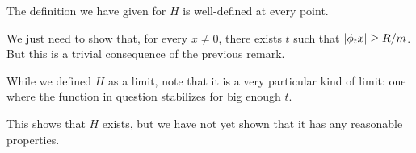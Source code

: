 \documentclass{article}
\DeclarePairedDelimiter{\abs}{\lvert}{\rvert}
\begin{document}
\begin{Proposition}
The definition we have given for $H$ is well-defined at every point.
\end{Proposition}

\begin{Proof}
We just need to show that, for every $x \neq 0$, there exists $t$ such that $\abs{\phi_t x} \geq R/m$. But this is a trivial consequence of the previous remark.
\end{Proof}

\begin{Remark}
While we defined $H$ as a limit, note that it is a very particular kind of limit: one where the function in question stabilizes for big enough $t$.
\end{Remark}

This shows that $H$ exists, but we have not yet shown that it has any reasonable properties.
\end{document}
